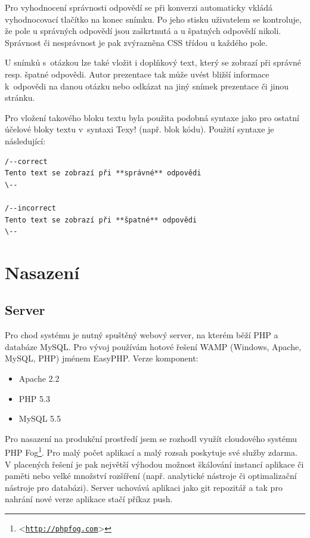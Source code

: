 \documentclass[11pt,twoside,a4paper]{book}
\let\oldUrl\url									%
\renewcommand\url[1]{<\texttt{\oldUrl{#1}}>}
\begin{document}
Pro vyhodnocení správnosti odpovědí se při konverzi automaticky vkládá vyhodnocovací tlačítko na konec snímku. Po jeho
stisku uživatelem se kontroluje, že pole u správných odpovědí jsou zaškrtnutá a u špatných odpovědí nikoli. Správnost
či nesprávnost je pak zvýrazněna CSS třídou u každého pole.

U snímků s~otázkou lze také vložit i doplňkový text, který se zobrazí při správné resp. špatné odpovědi. Autor
prezentace tak může uvést bližší informace k~odpovědi na danou otázku nebo odkázat na jiný snímek prezentace či jinou
stránku.

Pro vložení takového bloku textu byla použita podobná syntaxe jako pro ostatní účelové bloky textu v~syntaxi Texy!
(např. blok kódu). Použití syntaxe je následující:

\begin{lstlisting}[caption=Syntaxe doplňkových textů]
/--correct
Tento text se zobrazí při **správné** odpovědi
\--

/--incorrect
Tento text se zobrazí při **špatné** odpovědi
\--
\end{lstlisting}



\chapter{Nasazení}

\section{Server}
Pro chod systému je nutný spuštěný webový server, na kterém běží PHP a databáze MySQL. Pro vývoj používám hotové řešení WAMP (Windows, Apache, MySQL, PHP) jménem EasyPHP. Verze komponent:

\begin{itemize}
	\item Apache 2.2
	\item PHP 5.3
	\item MySQL 5.5
\end{itemize}

Pro nasazení na produkční prostředí jsem se rozhodl využít cloudového systému PHP Fog\footnote{\url{http://phpfog.com}}. Pro malý počet aplikací a malý rozsah poskytuje své služby zdarma. V placených řešení je pak největší výhodou možnost škálování instancí aplikace či paměti nebo velké množství rozšíření (např. analytické nástroje či optimalizační nástroje pro databázi). Server uchovává aplikaci jako git repozitář a tak pro nahrání nové verze aplikace stačí příkaz push.
\end{document}
